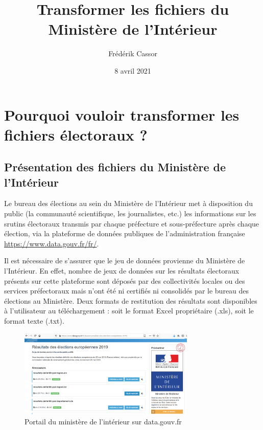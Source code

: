 \documentclass[
]{article}
\title{Transformer les fichiers du Ministère de l'Intérieur}
\author{Frédérik Cassor}
\date{8 avril 2021}
\begin{document}
\maketitle

\hypertarget{pourquoi-vouloir-transformer-les-fichiers-uxe9lectoraux}{%
\section{Pourquoi vouloir transformer les fichiers électoraux
?}\label{pourquoi-vouloir-transformer-les-fichiers-uxe9lectoraux}}

\hypertarget{pruxe9sentation-des-fichiers-du-ministuxe8re-de-lintuxe9rieur}{%
\subsection{Présentation des fichiers du Ministère de
l'Intérieur}\label{pruxe9sentation-des-fichiers-du-ministuxe8re-de-lintuxe9rieur}}

Le bureau des élections au sein du Ministère de l'Intérieur met à
disposition du public (la communauté scientifique, les journalistes,
etc.) les informations sur les srutins électoraux transmis par chaque
préfecture et sous-préfecture après chaque élection, via la plateforme
de données publiques de l'administration française
\url{https://www.data.gouv.fr/fr/}.

Il est nécessaire de s'assurer que le jeu de données provienne du
Ministère de l'Intérieur. En effet, nombre de jeux de données sur les
résultats électoraux présents sur cette plateforme sont déposés par des
collectivités locales ou des services préfectoraux mais n'ont été ni
certifiés ni consolidés par le bureau des élections au Ministère. Deux
formats de restitution des résultats sont disponibles à l'utilisateur au
téléchargement : soit le format Excel propriétaire (.xls), soit le
format texte (.txt).

\begin{figure}
\centering
\includegraphics[width=0.75\textwidth,height=\textheight]{fig/datagouvMI.png}
\caption{Portail du ministère de l'intérieur sur data.gouv.fr}
\end{figure}
\end{document}

